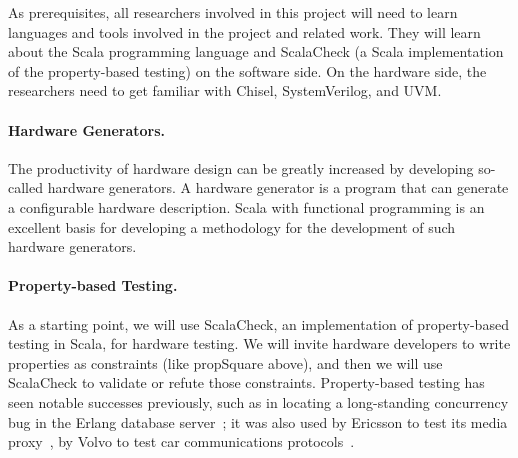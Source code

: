 \documentclass[fleqn,12pt]{article}
\begin{document}
As prerequisites, all researchers involved in this project will need to learn
languages and tools involved in the project and related work.
They will learn about the Scala programming language and ScalaCheck
(a Scala implementation of the property-based testing) on the software side.
On the hardware side,
the researchers need to get familiar with Chisel, SystemVerilog, and
UVM.


\paragraph{Hardware Generators.}

The productivity of hardware design can be greatly increased by developing so-called
hardware generators. A hardware generator is a program that can generate a configurable
hardware description.
Scala with functional programming is an excellent basis for developing a methodology for the
development of such hardware generators.


\paragraph{Property-based Testing.}
As a starting point, we will use ScalaCheck, an implementation of
property-based testing in Scala, for hardware testing. We will invite
hardware developers to write properties as constraints (like
propSquare above), and then we will use ScalaCheck to validate or
refute those constraints. Property-based testing has seen notable
successes previously, such as in locating a long-standing concurrency
bug in the Erlang database server~\cite{DBLP:conf/erlang/HughesB11};
it was also used by Ericsson to test its media
proxy~\cite{DBLP:conf/erlang/ArtsHJW06}, by Volvo to test car
communications protocols~\cite{DBLP:conf/icst/ArtsHNS15}.
\end{document}
